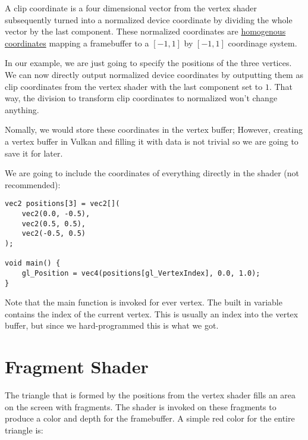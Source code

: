 \par A clip coordinate is a four dimensional vector from the vertex shader subsequently turned into a normalized device coordinate by dividing the whole vector by the last component. These normalized coordinates are \href{https://en.wikipedia.org/wiki/Homogeneous_coordinates}{homogenous coordinates} mapping a framebuffer to a $\left[-1,1\right]$ by  $\left[-1,1\right]$ coordinage system.

\par In our example, we are just going to specify the positions of the three vertices. We can now directly output normalized device coordinates by outputting them as clip coordinates from the vertex shader with the last component set to $1$. That way, the division to transform clip coordinates to normalized won't change anything.

\par Nomally, we would store these coordinates in the vertex buffer; However, creating a vertex buffer in Vulkan and filling it with data is not trivial so we are going to save it for later.

\par We are going to include the coordinates of everything directly in the shader (not recommended):

\begin{center}
\begin{minipage}{0.95\linewidth}
\begin{lstlisting}
vec2 positions[3] = vec2[](
    vec2(0.0, -0.5),
    vec2(0.5, 0.5),
    vec2(-0.5, 0.5)
);

void main() {
    gl_Position = vec4(positions[gl_VertexIndex], 0.0, 1.0);
}
\end{lstlisting}
\end{minipage}
\end{center}

\par Note that the main function is invoked for ever vertex. The built in  variable contains the index of the current vertex. This is usually an index into the vertex buffer, but since we hard-programmed this is what we got.

\section*{Fragment Shader}

\par The triangle that is formed by the positions from the vertex shader fills an area on the screen with fragments. The shader is invoked on these fragments to produce a color and depth for the framebuffer. A simple red color for the entire triangle is:

